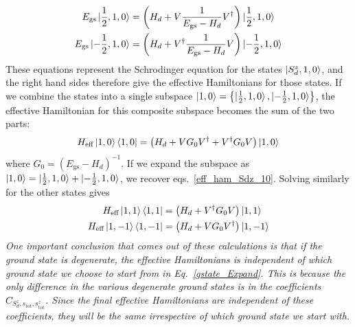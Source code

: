 \documentclass{revtex4-2}
\begin{document}
\begin{align}
	\label{eff_ham_Sdz_10}
	E_\text{gs} \ket{\frac{1}{2}, 1, 0} &= \left(H_d + V \frac{1}{E_\text{gs} - H_d}V^\dagger\right) \ket{\frac{1}{2}, 1, 0}\\
	E_\text{gs} \ket{-\frac{1}{2}, 1, 0} &= \left(H_d + V^\dagger \frac{1}{E_\text{gs} - H_d} V\right) \ket{-\frac{1}{2}, 1, 0}\\
\end{align}
These equations represent the Schrodinger equation for the states \(\ket{S_d^z, 1, 0}\), and the right hand sides therefore give the effective Hamiltonians for those states. If we combine the states into a single subspace \(\ket{1,0}= \left\{\ket{\frac{1}{2}, 1, 0}, \ket{-\frac{1}{2}, 1, 0}\right\}\), the effective Hamiltonian for this composite subspace becomes the sum of the two parts:
\begin{align}
	\label{eff_ham_10}
	H_\text{eff}\ket{1, 0}\bra{1, 0} = \left(H_d + V G_0 V^\dagger + V^\dagger G_0  V\right) \ket{1, 0}
\end{align}
where \(G_0 = \left(E_\text{gs} - H_d\right)^{-1}\). If we expand the subspace as \(\ket{1,0} = \ket{\frac{1}{2}, 1, 0} + \ket{-\frac{1}{2}, 1, 0}\), we recover eqs.~\ref{eff_ham_Sdz_10}. Solving similarly for the other states gives
\begin{align}
	H_\text{eff}\ket{1,  1}\bra{1,  1} &= \left(H_d + V^\dagger G_0  V\right) \ket{1,  1}\\
	H_\text{eff}\ket{1, - 1}\bra{1, - 1} &= \left(H_d + V G_0 V^\dagger\right) \ket{1, - 1}
\end{align}
\textit{One important conclusion that comes out of these calculations is that if the ground state is degenerate, the effective Hamiltonians is independent of which ground state we choose to start from in Eq.~\ref{gstate_Expand}. This is because the only difference in the various degenerate ground states is in the coefficients \(C_{S_d^z, s_\text{tot},s_\text{tot}^z}\). Since the final effective Hamiltonians are independent of these coefficients, they will be the same irrespective of which ground state we start with.}
\end{document}
